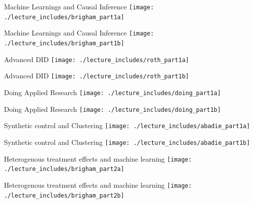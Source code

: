 \documentclass{beamer}
\begin{document}
\begin{frame}{Machine Learnings and Causal Inference}
  \centering
  \texttt{[image: ./lecture\_includes/brigham\_part1a]}
\end{frame}

\begin{frame}{Machine Learnings and Causal Inference}
  \centering
  \texttt{[image: ./lecture\_includes/brigham\_part1b]}
\end{frame}

\begin{frame}{Advanced DID}
  \centering
  \texttt{[image: ./lecture\_includes/roth\_part1a]}
\end{frame}

\begin{frame}{Advanced DID}
  \centering
  \texttt{[image: ./lecture\_includes/roth\_part1b]}
\end{frame}

\begin{frame}{Doing Applied Research}
  \centering
  \texttt{[image: ./lecture\_includes/doing\_part1a]}
\end{frame}

\begin{frame}{Doing Applied Research}
  \centering
  \texttt{[image: ./lecture\_includes/doing\_part1b]}
\end{frame}


\begin{frame}{Synthetic control and Clustering}
  \centering
  \texttt{[image: ./lecture\_includes/abadie\_part1a]}
\end{frame}

\begin{frame}{Synthetic control and Clustering}
  \centering
  \texttt{[image: ./lecture\_includes/abadie\_part1b]}
\end{frame}

\begin{frame}{Heterogenous treatment effects and machine learning}
  \centering
  \texttt{[image: ./lecture\_includes/brigham\_part2a]}
\end{frame}

\begin{frame}{Heterogenous treatment effects and machine learning}
  \centering
  \texttt{[image: ./lecture\_includes/brigham\_part2b]}
\end{frame}
\end{document}
